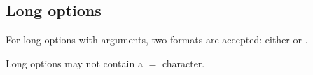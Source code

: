 


\subsection{Long options}

For long options with arguments, two formats are accepted: either
 or .

Long options may not contain a $=$ character.




